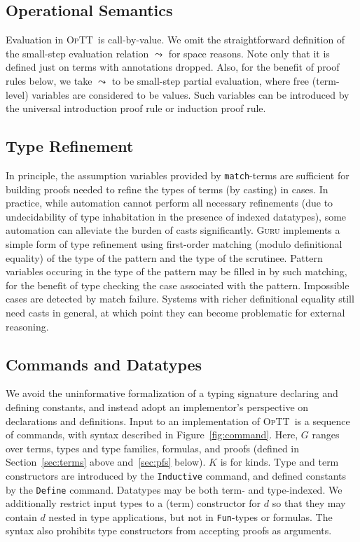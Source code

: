 \documentclass[preprint,natbib]{sigplanconf}
\newcommand{\optt}{\textsc{OpTT}}
\begin{document}
\subsection{Operational Semantics}
\label{sec:opsem}

Evaluation in \optt\ is call-by-value.  We omit the straightforward
definition of the small-step evaluation relation $\leadsto$ for space
reasons.  Note only that it is defined just on terms with annotations
dropped.  Also, for the benefit of proof rules below, we take
$\leadsto$ to be small-step partial evaluation, where free
(term-level) variables are considered to be values.  Such variables
can be introduced by the universal introduction proof rule or
induction proof rule.

\subsection{Type Refinement}

In principle, the assumption variables provided by
\texttt{match}-terms are sufficient for building proofs needed to
refine the types of terms (by casting) in cases.  In practice, while
automation cannot perform all necessary refinements (due to
undecidability of type inhabitation in the presence of indexed
datatypes), some automation can alleviate the burden of casts
significantly.  \textsc{Guru} implements a simple form of type
refinement using first-order matching (modulo definitional equality)
of the type of the pattern and the type of the scrutinee.  Pattern
variables occuring in the type of the pattern may be filled in by such
matching, for the benefit of type checking the case associated with
the pattern.  Impossible cases are detected by match failure.  Systems
with richer definitional equality still need casts in general, at
which point they can become problematic for external reasoning.

\subsection{Commands and Datatypes}
\label{sec:commands}

We avoid the uninformative formalization of a typing signature
declaring and defining constants, and instead adopt an implementor's
perspective on declarations and definitions.  Input to an
implementation of \optt\ is a sequence of commands, with syntax
described in Figure~\ref{fig:command}.  Here, $G$ ranges over terms,
types and type families, formulas, and proofs (defined in
Section~\ref{sec:terms} above and~\ref{sec:pfs} below).  $K$ is for
kinds.  Type and term constructors are introduced by the
\texttt{Inductive} command, and defined constants by the
\texttt{Define} command.  Datatypes may be both term- and
type-indexed.  We additionally restrict input types to a (term)
constructor for $d$ so that they may contain $d$ nested in type
applications, but not in \texttt{Fun}-types or formulas.  The syntax
also prohibits type constructors from accepting proofs as arguments.
\end{document}
